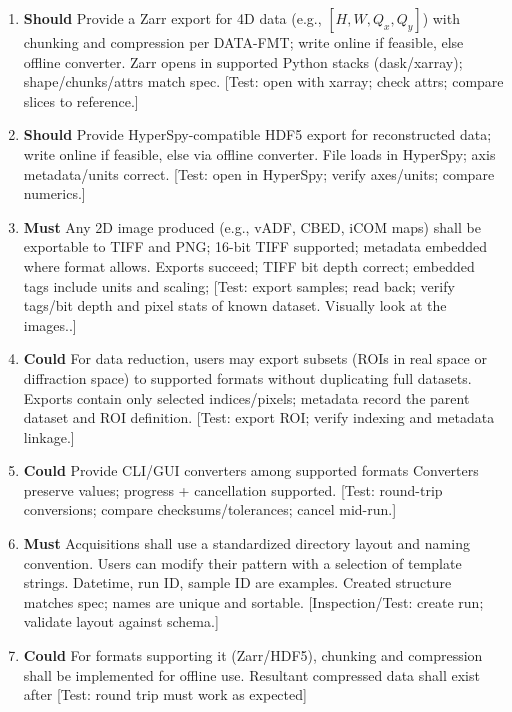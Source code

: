 \documentclass[10pt]{article}
\newcommand{\PriorityTag}[2]{%
  \colorbox{#2!25}{\footnotesize\textsf{\textbf{#1}}}\hspace{0.6em}}
\newcommand{\must}{\leavevmode\PriorityTag{Must}{green}}
\newcommand{\should}{\leavevmode\PriorityTag{Should}{yellow}}
\newcommand{\could}{\leavevmode\PriorityTag{Could}{cyan}}
\newcounter{reqgrp}[section] %
\newcounter{reqno}
\newcommand{\reqprefix}{GEN}
\newenvironment{requirements}[1]{%
  \renewcommand{\reqprefix}{#1}%
  \refstepcounter{reqgrp}%
  \setcounter{reqno}{0}%
  \begin{enumerate}[leftmargin=*]
}{\end{enumerate}}
\begin{document}
\begin{requirements}{OUT}
\item \should {}
  {Provide a Zarr export for 4D data (e.g., \([H,W,Q_x,Q_y]\)) with chunking and compression per DATA-FMT; write online if feasible, else offline converter.}
  {Zarr opens in supported Python stacks (dask/xarray); shape/chunks/attrs match spec.}
  [Test: open with xarray; check attrs; compare slices to reference.]

\item \should {}
  {Provide HyperSpy-compatible HDF5 export for reconstructed data; write online if feasible, else via offline converter.}
  {File loads in HyperSpy; axis metadata/units correct.}
  [Test: open in HyperSpy; verify axes/units; compare numerics.]

\item \must {}
  {Any 2D image produced (e.g., vADF, CBED, iCOM maps) shall be exportable to TIFF and PNG; 16-bit TIFF supported; metadata embedded where format allows.}
  {Exports succeed; TIFF bit depth correct; embedded tags include units and scaling; }
  [Test: export samples; read back; verify tags/bit depth and pixel stats of known dataset. Visually look at the images..]

\item \could {}
  {For data reduction, users may export subsets (ROIs in real space or diffraction space) to supported formats without duplicating full datasets.}
  {Exports contain only selected indices/pixels; metadata record the parent dataset and ROI definition.}
  [Test: export ROI; verify indexing and metadata linkage.]

\item \could {}
  {Provide CLI/GUI converters among supported formats}
  {Converters preserve values; progress + cancellation supported.}
  [Test: round-trip conversions; compare checksums/tolerances; cancel mid-run.]

\item \must {}
  {Acquisitions shall use a standardized directory layout and naming convention. Users can modify their pattern with a selection of template strings. Datetime, run ID, sample ID are examples.}
  {Created structure matches spec; names are unique and sortable.}
  [Inspection/Test: create run; validate layout against schema.]

\item \could {}
  {For formats supporting it (Zarr/HDF5), chunking and compression shall be implemented for offline use.}
  {Resultant compressed data shall exist after }
  [Test: round trip must work as expected]

\end{requirements}
\end{document}
